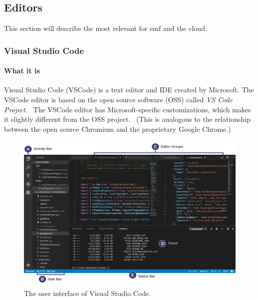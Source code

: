\subsection{Editors}\label{sec:editors}

This section will describe the most relevant  for \acrlong{emf} and the \gls{cloud}.

\subsubsection{Visual Studio Code}\label{sec:vscode}

\paragraph*{What it is}
Visual Studio Code (\gls{VSCode}) is a text editor and \acrfull{IDE} created by
Microsoft. The VSCode editor is based on the \gls{open source} software (OSS) called \emph{VS Code Project}.~\cite{helmingEclipseTheiaIDE2019} 
The VSCode editor has Microsoft-specific customizations, which makes it slightly different from the OSS project.~\cite{microsoftMicrosoftVscode2020} (This is analogous to the relationship between the \gls{open source} Chromium and the proprietary Google Chrome.)

\begin{figure}[htbp]  %
  \centering
  \includegraphics[width=\textwidth]{figures/vscode-ui}
  \caption[Visual Studio Code User Interface]{The user interface of Visual Studio Code.\cite{microsoftVisualStudioCode2020}}\label{fig:vscode-ui}
\end{figure}

